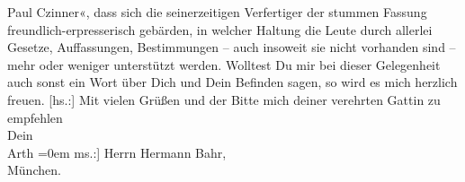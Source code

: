 \begin{ledgroupsized}[t]{13cm}
{{{                        Paul Czinner}}}\label{K_L02546_5h}«, dass sich die seinerzeitigen Verfertiger der stummen Fassung
               freundlich-erpresserisch gebärden, in welcher Haltung die Leute durch allerlei
               Gesetze, Auffassungen, Bestimmungen – auch insoweit sie nicht vorhanden sind – mehr
               oder weniger unterstützt werden.\pend
           \pstart
           Wolltest Du mir bei dieser Gelegenheit auch sonst ein Wort über Dich und Dein
               Befinden sagen, so wird es mich herzlich freuen.\pend
           \pstart
           {[}hs.:{]} Mit vielen Grüßen und der Bitte mich deiner verehrten Gattin zu empfehlen{\\[\baselineskip]}Dein{\\[\baselineskip]}\spacefill\mbox{Arth}\pend
           \leftskip=0em{}\pstart
           \noindent{}{[}ms.:{]}  Herrn Hermann Bahr,{\\}München.\pend
           
         
         \endnumbering{}\end{ledgroupsized}  \newcommand{\dateiname}{L02546}\newcommand{\titel}{Arthur Schnitzler an Hermann Bahr, 5. 9. 1931}\newcommand{\editorInnen}{ Kurt Ifkovits,  Martin Anton Müller}
      